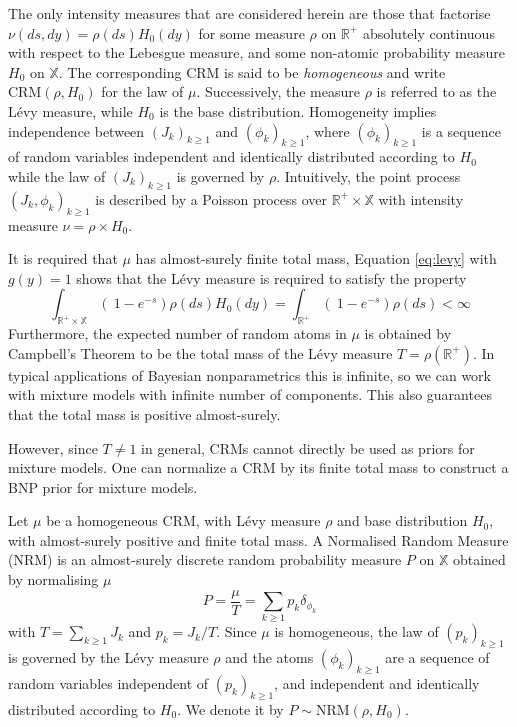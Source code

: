 The only intensity measures that are considered herein are those that factorise $\nu(ds, dy) = \rho(ds)H_0(dy)$ for some measure $\rho$ on $\mathbb{R}^+$ absolutely continuous with respect to the Lebesgue measure, and some non-atomic probability measure $H_0$ on $\mathbb{X}$. The corresponding \gls{CRM} is said to be \textit{homogeneous} and write $\text{CRM}(\rho, H_0)$ for the law of $\mu$. Successively, the measure $\rho$ is referred to as the Lévy measure, while $H_0$ is the base distribution.
Homogeneity implies independence between $\left(J_k \right)_{k\ge1}$ and $\left(\phi_k \right)_{k\ge1}$, where $\left(\phi_k \right)_{k\ge1}$ is a sequence of random variables independent and identically distributed according to $H_0$ while the law of $\left(J_k \right)_{k\ge1}$  is governed by $\rho$. Intuitively, the point process $\left(J_k, \phi_k \right)_{k\ge1}$  is described by a Poisson process over $\mathbb{R}^+ \times \mathbb{X}$ with intensity measure $\nu = \rho \times H_0$.

It is required that $\mu$ has almost-surely finite total mass, Equation \ref{eq:levy} with $g(y)=1$ shows that the Lévy measure is required to satisfy the property
$$ \int_{\mathbb{R}^+ \times \mathbb{X}} \left( \  1 - e^{-s} \right) \rho(ds) H_0(dy) = 
\int_{\mathbb{R}^+} \left( \  1 - e^{-s} \right) \rho(ds) < \infty $$
Furthermore, the expected number of random atoms in $\mu$ is obtained by Campbell’s Theorem to be the total mass of the Lévy measure $T = \rho(\mathbb{R}^+)$. In typical applications of Bayesian nonparametrics this is infinite, so we can work with mixture models with infinite number of components. This also guarantees that the total mass is positive almost-surely. 

However, since $T \neq 1$ in general, \glspl{CRM} cannot directly be used as priors for mixture models.
One can normalize a \gls{CRM} by its finite total mass to construct a BNP prior for mixture models.\\

\begin{definition} \label{def:NRM}
Let $\mu$ be a homogeneous \gls{CRM}, with Lévy measure $\rho$ and base distribution $H_0$, with almost-surely positive and finite total mass. A Normalised Random Measure (NRM) is an almost-surely discrete random probability measure $P$ on $\mathbb{X}$ obtained by normalising $\mu$
$$ P = \frac{\mu}{T} = \sum_{k \ge 1}{p_k \delta_{\phi_k}} $$
with $T = \sum_{k \ge 1}{J_k}$ and $p_k = J_k / T$.
Since $\mu$ is homogeneous, the law of $\left(p_k \right)_{k \ge 1}$ is governed by the Lévy measure $\rho$ and the atoms $\left(\phi_k \right)_{k \ge 1}$ are a sequence of random variables independent of $\left(p_k \right)_{k \ge 1}$, and independent and identically distributed according to $H_0$.
We denote it by $P \sim \text{NRM}(\rho, H_0)$. \\
\end{definition}

